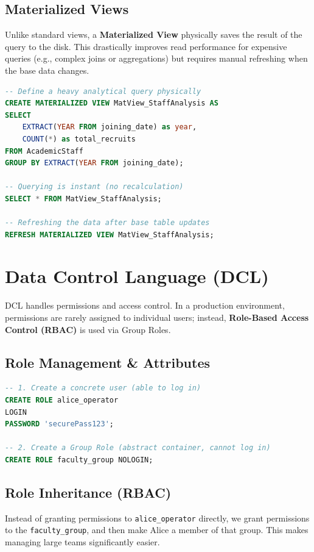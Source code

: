 \documentclass[12pt,a4paper]{article}
\begin{document}
\subsection{Materialized Views}
Unlike standard views, a \textbf{Materialized View} physically saves the result of the query to the disk. This drastically improves read performance for expensive queries (e.g., complex joins or aggregations) but requires manual refreshing when the base data changes.

\begin{lstlisting}[language=SQL]
-- Define a heavy analytical query physically
CREATE MATERIALIZED VIEW MatView_StaffAnalysis AS
SELECT 
    EXTRACT(YEAR FROM joining_date) as year,
    COUNT(*) as total_recruits
FROM AcademicStaff
GROUP BY EXTRACT(YEAR FROM joining_date);

-- Querying is instant (no recalculation)
SELECT * FROM MatView_StaffAnalysis;

-- Refreshing the data after base table updates
REFRESH MATERIALIZED VIEW MatView_StaffAnalysis;
\end{lstlisting}

\newpage
\section{Data Control Language (DCL)}
DCL handles permissions and access control. In a production environment, permissions are rarely assigned to individual users; instead, \textbf{Role-Based Access Control (RBAC)} is used via Group Roles.

\subsection{Role Management \& Attributes}
\begin{lstlisting}[language=SQL]
-- 1. Create a concrete user (able to log in)
CREATE ROLE alice_operator 
LOGIN 
PASSWORD 'securePass123';

-- 2. Create a Group Role (abstract container, cannot log in)
CREATE ROLE faculty_group NOLOGIN;
\end{lstlisting}

\subsection{Role Inheritance (RBAC)}
Instead of granting permissions to \texttt{alice\_operator} directly, we grant permissions to the \texttt{faculty\_group}, and then make Alice a member of that group. This makes managing large teams significantly easier.
\end{document}

